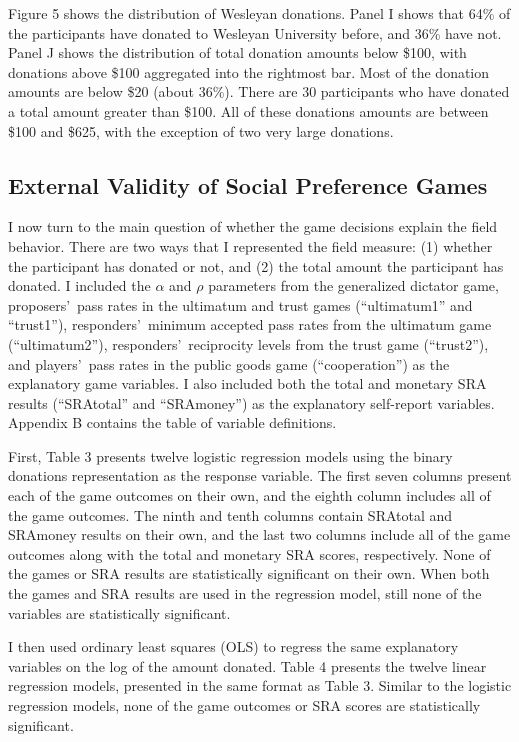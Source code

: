 \documentclass[12pt]{article}
\begin{document}
Figure 5 shows the distribution of Wesleyan donations. Panel I shows that 64\% of the participants have donated to Wesleyan University before, and 36\% have not. Panel J shows the distribution of total donation amounts below \$100, with donations above \$100 aggregated into the rightmost bar. Most of the donation amounts are below \$20 (about 36\%). There are 30 participants who have donated a total amount greater than \$100. All of these donations amounts are between \$100 and \$625, with the exception of two very large donations.

\subsection{External Validity of Social Preference Games}
I now turn to the main question of whether the game decisions explain the field behavior. There are two ways that I represented the field measure: (1) whether the participant has donated or not, and (2) the total amount the participant has donated. I included the \(\alpha\) and \(\rho\) parameters from the generalized dictator game, proposers\rq \ pass rates in the ultimatum and trust games (``ultimatum1'' and ``trust1''), responders\rq \ minimum accepted pass rates from the ultimatum game (``ultimatum2''), responders\rq \ reciprocity levels from the trust game (``trust2''), and players\rq \ pass rates in the public goods game (``cooperation'') as the explanatory game variables. I also included both the total and monetary SRA results (``SRAtotal'' and ``SRAmoney'') as the explanatory self-report variables. Appendix B contains the table of variable definitions. 

First, Table 3 presents twelve logistic regression models using the binary donations representation as the response variable. The first seven columns present each of the game outcomes on their own, and the eighth column includes all of the game outcomes. The ninth and tenth columns contain SRAtotal and SRAmoney results on their own, and the last two columns include all of the game outcomes along with the total and monetary SRA scores, respectively. None of the games or SRA results are statistically significant on their own. When both the games and SRA results are used in the regression model, still none of the variables are statistically significant. 

I then used ordinary least squares (OLS) to regress the same explanatory variables on the log of the amount donated. Table 4 presents the twelve linear regression models, presented in the same format as Table 3. Similar to the logistic regression models, none of the game outcomes or SRA scores are statistically significant.
\end{document}
